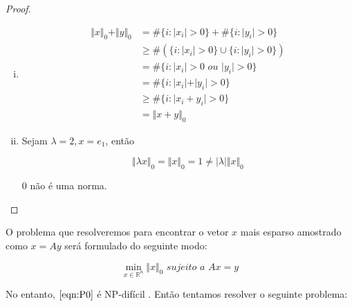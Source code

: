 \begin{proof}
\begin{enumerate}[(i)]
\item
\begin{subequations}
\begin{align*}
\Vert x \Vert_0 + \Vert y \Vert_0 & = \# \lbrace i : \vert x_i \vert > 0 \rbrace
									+ \# \lbrace i : \vert y_i \vert > 0 \rbrace \\
& \geq \#(\lbrace i : \vert x_i \vert > 0 \rbrace \cup \lbrace i : \vert y_i \vert > 0 \rbrace) \\
& = \# \lbrace i : \vert x_i \vert > 0 \textit{ ou } \vert y_i \vert > 0 \rbrace \\
& = \# \lbrace i : \vert x_i \vert + \vert y_i \vert > 0 \rbrace \\
& \geq  \# \lbrace i : \vert x_i + y_i \vert > 0\rbrace \\
& = \Vert x + y \Vert_0
\end{align*}
\end{subequations}

\item Sejam $\lambda = 2, x = e_1$, então

$$ \Vert \lambda x \Vert_0 = \Vert x \Vert_0 = 1 \neq \vert \lambda \vert \Vert x \Vert_0 $$

 $0$ não é uma norma.
\end{enumerate}
\end{proof}

O problema que resolveremos para encontrar o vetor $x$ mais esparso amostrado como $x = Ay$ será formulado do seguinte modo:

\begin{equation}
\tag{$P_0$}
\min_{x \in \mathbb{R}^n} \Vert x \Vert_{0} \textit{ sujeito a } Ax = y
\label{eqn:P0}
\end{equation}

No entanto, $\eqref{eqn:P0}$ é NP-difícil \cite{fourau}. Então tentamos resolver o seguinte problema:


